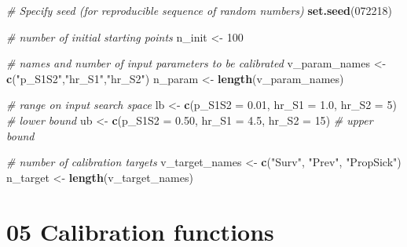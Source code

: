 \documentclass[
]{article}
\newenvironment{Shaded}{\begin{snugshade}}{\end{snugshade}}
\newcommand{\CommentTok}[1]{\textcolor[rgb]{0.56,0.35,0.01}{\textit{#1}}}
\newcommand{\DataTypeTok}[1]{\textcolor[rgb]{0.13,0.29,0.53}{#1}}
\newcommand{\DecValTok}[1]{\textcolor[rgb]{0.00,0.00,0.81}{#1}}
\newcommand{\FloatTok}[1]{\textcolor[rgb]{0.00,0.00,0.81}{#1}}
\newcommand{\KeywordTok}[1]{\textcolor[rgb]{0.13,0.29,0.53}{\textbf{#1}}}
\newcommand{\NormalTok}[1]{#1}
\newcommand{\StringTok}[1]{\textcolor[rgb]{0.31,0.60,0.02}{#1}}
\begin{document}
\begin{Shaded}
\begin{Highlighting}[]
\CommentTok{# Specify seed (for reproducible sequence of random numbers)}
\KeywordTok{set.seed}\NormalTok{(}\DecValTok{072218}\NormalTok{)}

\CommentTok{# number of initial starting points}
\NormalTok{n_init <-}\StringTok{ }\DecValTok{100}

\CommentTok{# names and number of input parameters to be calibrated}
\NormalTok{v_param_names <-}\StringTok{ }\KeywordTok{c}\NormalTok{(}\StringTok{"p_S1S2"}\NormalTok{,}\StringTok{"hr_S1"}\NormalTok{,}\StringTok{"hr_S2"}\NormalTok{)}
\NormalTok{n_param <-}\StringTok{ }\KeywordTok{length}\NormalTok{(v_param_names)}

\CommentTok{# range on input search space}
\NormalTok{lb <-}\StringTok{ }\KeywordTok{c}\NormalTok{(}\DataTypeTok{p_S1S2 =} \FloatTok{0.01}\NormalTok{, }\DataTypeTok{hr_S1 =} \FloatTok{1.0}\NormalTok{, }\DataTypeTok{hr_S2 =} \DecValTok{5}\NormalTok{) }\CommentTok{# lower bound}
\NormalTok{ub <-}\StringTok{ }\KeywordTok{c}\NormalTok{(}\DataTypeTok{p_S1S2 =} \FloatTok{0.50}\NormalTok{, }\DataTypeTok{hr_S1 =} \FloatTok{4.5}\NormalTok{, }\DataTypeTok{hr_S2 =} \DecValTok{15}\NormalTok{) }\CommentTok{# upper bound}

\CommentTok{# number of calibration targets}
\NormalTok{v_target_names <-}\StringTok{ }\KeywordTok{c}\NormalTok{(}\StringTok{"Surv"}\NormalTok{, }\StringTok{"Prev"}\NormalTok{, }\StringTok{"PropSick"}\NormalTok{)}
\NormalTok{n_target <-}\StringTok{ }\KeywordTok{length}\NormalTok{(v_target_names)}
\end{Highlighting}
\end{Shaded}

\hypertarget{calibration-functions}{%
\section{05 Calibration functions}\label{calibration-functions}}
\end{document}
